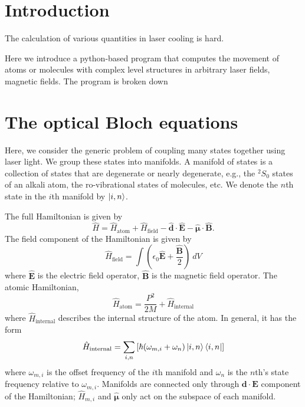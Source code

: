 \documentclass[final,5p,times,twocolumn]{elsarticle}
\begin{document}
\section{Introduction}
\label{sec:intro}
The calculation of various quantities in laser cooling is hard.

Here we introduce a python-based program that computes the movement of atoms or molecules with complex level structures in arbitrary laser fields, magnetic fields.  The program is broken down

\section{The optical Bloch equations}
Here, we consider the generic problem of coupling many states together using laser light.
We group these states into manifolds.
A manifold of states is a collection of states that are degenerate or nearly degenerate, e.g., the $^2S_0$ states of an alkali atom, the ro-vibrational states of molecules, etc.
We denote the $n$th state in the $i$th manifold by $\ket{i, n}$.

The full Hamiltonian is given by
\begin{equation}
    \label{eq:obe:generic_hamiltonian}
    \hat{H} = \hat{H}_\text{atom} + \hat{H}_\text{field} -
    \hat{\boldsymbol{d}}\cdot\hat{\mathbf{E}} -
    \hat{\boldsymbol{\mu}}\cdot\hat{\mathbf{B}}.
\end{equation}
The field component of the Hamiltonian is given by
\begin{equation}
    \label{eq:obe:field}
    \hat{H}_\text{field} = \int \left(\epsilon_0 \hat{\mathbf{E}} +
    \frac{\hat{\mathbf{B}}}{2}\right)\ dV
\end{equation}
where $\hat{\mathbf{E}}$ is the electric field operator, $\hat{\mathbf{B}}$ is the magnetic field operator.
The atomic Hamiltonian,
\begin{equation}
    \hat{H}_\text{atom} = \frac{P^2}{2M} + \hat{H}_\text{internal}
\end{equation}
where $\hat{H}_\text{internal}$ describes the internal structure of the atom.
In general, it has the form
\begin{equation}
	\hat{H}_\text{internal} = \sum_{i,n}\left[\hbar(\omega_{m,i} + \omega_n)\ket{i,n}\Bra{i, n}\right]
\end{equation}
where $\omega_{m,i}$ is the offset frequency of the $i$th manifold and $\omega_n$ is the $n$th's state frequency relative to $\omega_{m,i}$.  Manifolds are connected only through $\mathbf{d}\cdot\mathbf{E}$ component of the Hamiltonian; $\hat{H}_{m,i}$ and $\hat{\boldsymbol{\mu}}$ only act on the subspace of each manifold.
\end{document}

